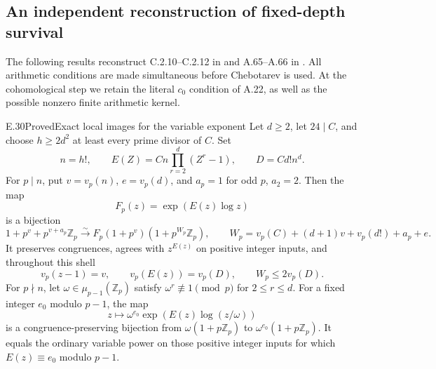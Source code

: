 \subsection{An independent reconstruction of fixed-depth survival}

The following results reconstruct C.2.10--C.2.12 in
 and A.65--A.66 in .
All arithmetic conditions are
made simultaneous before Chebotarev is used.  At the cohomological
step we retain the literal $c_0$ condition of A.22, as well as the
possible nonzero finite arithmetic kernel.

\begin{result}{E.30}{Proved}{Exact local images for the variable exponent}
\label{coh:variable-image}
Let $d\ge2$, let $24\mid C$, and choose $h\ge2d^2$ at least every
prime divisor of $C$.  Set
\[
 n=h!,\qquad E(Z)=Cn\prod_{r=2}^d(Z^r-1),\qquad D=Cd!n^d.
\]
For $p\mid n$, put $v=v_p(n)$, $e=v_p(d)$, and $a_p=1$ for
odd $p$, $a_2=2$.  Then the map
\[
 F_p(z)=\exp(E(z)\log z)
\]
is a bijection
\[
 1+p^v+p^{v+a_p}\mathbb Z_p
 \xrightarrow{\sim}
 F_p(1+p^v)(1+p^{W_p}\mathbb Z_p),\qquad
 W_p=v_p(C)+(d+1)v+v_p(d!)+a_p+e.
 \tag{E.30.1}
\]
It preserves congruences, agrees with $z^{E(z)}$ on positive integer
inputs, and throughout this shell
\[
 v_p(z-1)=v,\qquad v_p(E(z))=v_p(D),\qquad W_p\le2v_p(D).
 \tag{E.30.2}
\]
For $p\nmid n$, let $\omega\in\mu_{p-1}(\mathbb Z_p)$ satisfy
$\omega^r\not\equiv1\pmod p$ for $2\le r\le d$.  For a fixed
integer $e_0$ modulo $p-1$, the map
\[
 z\longmapsto \omega^{e_0}
       \exp(E(z)\log(z/\omega))
 \tag{E.30.3}
\]
is a congruence-preserving bijection from $\omega(1+p\mathbb Z_p)$
to $\omega^{e_0}(1+p\mathbb Z_p)$.  It equals the ordinary variable
power on those positive integer inputs for which $E(z)\equiv e_0$
modulo $p-1$.
\end{result}
